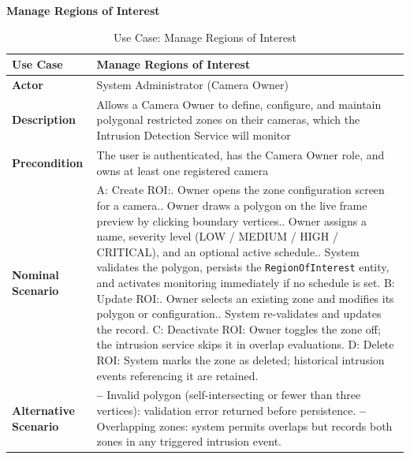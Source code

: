 \textbf{Manage Regions of Interest}
\begin{table}[H]
\centering\small
\begin{tabular}{|>{\bfseries}p{3cm}|p{10cm}|}
\hline
Use Case    & Manage Regions of Interest \\ \hline
Actor       & System Administrator (Camera Owner) \\ \hline
Description & Allows a Camera Owner to define, configure, and maintain polygonal restricted zones on their cameras, which the Intrusion Detection Service will monitor \\ \hline
Precondition & The user is authenticated, has the Camera Owner role, and owns at least one registered camera \\ \hline
Nominal Scenario &
A: Create ROI:\newline
1. Owner opens the zone configuration screen for a camera.\newline
2. Owner draws a polygon on the live frame preview by clicking boundary vertices.\newline
3. Owner assigns a name, severity level (LOW / MEDIUM / HIGH / CRITICAL), and an optional active schedule.\newline
4. System validates the polygon, persists the \texttt{RegionOfInterest} entity, and activates monitoring immediately if no schedule is set.\newline
B: Update ROI:\newline
1. Owner selects an existing zone and modifies its polygon or configuration.\newline
2. System re-validates and updates the record.\newline
C: Deactivate ROI: Owner toggles the zone off; the intrusion service skips it in overlap evaluations.\newline
D: Delete ROI: System marks the zone as deleted; historical intrusion events referencing it are retained. \\ \hline
Alternative Scenario &
\textbf{--} Invalid polygon (self-intersecting or fewer than three vertices): validation error returned before persistence.\newline
\textbf{--} Overlapping zones: system permits overlaps but records both zones in any triggered intrusion event. \\ \hline
\end{tabular}
\caption{Use Case: Manage Regions of Interest}
\label{tab:uc_roi}
\end{table}

